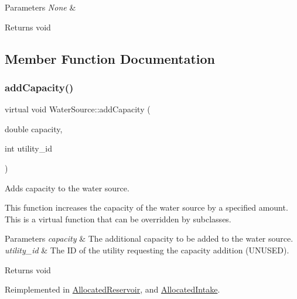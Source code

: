 \begin{DoxyParams}{Parameters}
{\em None} & \\
\hline
\end{DoxyParams}
\begin{DoxyReturn}{Returns}
void 
\end{DoxyReturn}


\subsection{Member Function Documentation}
\mbox{\label{classWaterSource_ab869abb3d3dde1875e933482bedc3ae3}} 
\subsubsection{\texorpdfstring{add\+Capacity()}{addCapacity()}}
{\footnotesize\ttfamily virtual void Water\+Source\+::add\+Capacity (\begin{DoxyParamCaption}\item[{double}]{capacity,  }\item[{int}]{utility\+\_\+id }\end{DoxyParamCaption})\hspace{0.3cm}{\ttfamily [virtual]}}



Adds capacity to the water source. 

This function increases the capacity of the water source by a specified amount. This is a virtual function that can be overridden by subclasses.


\begin{DoxyParams}{Parameters}
{\em capacity} & The additional capacity to be added to the water source. \\
\hline
{\em utility\+\_\+id} & The ID of the utility requesting the capacity addition (U\+N\+U\+S\+ED).\\
\hline
\end{DoxyParams}
\begin{DoxyReturn}{Returns}
void 
\end{DoxyReturn}


Reimplemented in \mbox{\hyperlink{classAllocatedReservoir_a191cf4347eb2ea57b203c102f8fc805e}{Allocated\+Reservoir}}, and \mbox{\hyperlink{classAllocatedIntake_a32a52eb269d4de861cc844633eceefb0}{Allocated\+Intake}}.

